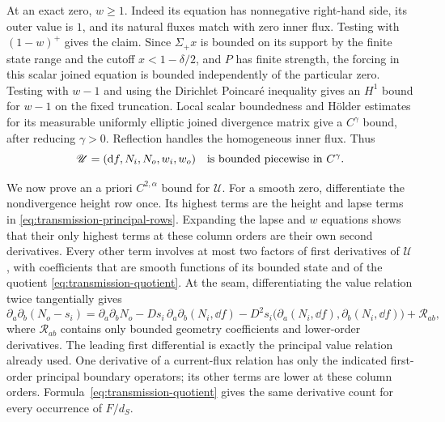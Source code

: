 At an exact zero, $w\geq1$.  Indeed its equation has nonnegative
right-hand side, its outer value is $1$, and its natural fluxes
match with zero inner flux.  Testing with $(1-w)^+$ gives the claim.
Since $\Sigma_+x$ is bounded on its support by the finite state
range and the cutoff $x<1-\delta/2$, and $P$ has finite strength,
the forcing in this scalar joined equation is bounded independently
of the particular zero.  Testing with $w-1$ and using the
Dirichlet Poincar\'e inequality gives an $H^1$ bound for $w-1$ on
the fixed truncation.  Local scalar boundedness and H\"older estimates
for its measurable uniformly elliptic joined divergence matrix give
a $C^\gamma$ bound, after reducing $\gamma>0$.  Reflection handles
the homogeneous inner flux.  Thus
\begin{equation}
 \mathscr U=(\mathop{}\!\mathrm d f,N_i,N_o,w_i,w_o)
 \quad\hbox{is bounded piecewise in }C^\gamma.
 \label{eq:transmission-state-holder-all}
\end{equation}

We now prove an a priori $C^{2,\alpha}$ bound for $\mathscr U$.
For a smooth zero, differentiate the nondivergence height row once.
Its highest terms are the height and lapse terms in
\eqref{eq:transmission-principal-rows}.  Expanding the lapse and
$w$ equations shows that their only highest terms at these column
orders are their own second derivatives.  Every other term involves
at most two factors of first derivatives of $\mathscr U$, with
coefficients that are smooth functions of its bounded state and of
the quotient \eqref{eq:transmission-quotient}.  At the seam,
differentiating the value relation twice tangentially gives
\begin{equation}
 \partial_a\partial_b(N_o-s_i)
  =\partial_a\partial_b N_o
    -D s_i\,\partial_a\partial_b(N_i,\dd f)
    -D^2s_i\bigl(\partial_a(N_i,\dd f),
                 \partial_b(N_i,\dd f)\bigr)
    +\mathcal R_{ab},
 \label{eq:transmission-value-differentiation}
\end{equation}
where $\mathcal R_{ab}$ contains only bounded geometry coefficients
and lower-order derivatives.  The leading first differential is
exactly the principal value relation already used.  One derivative
of a current-flux relation has only the indicated first-order
principal boundary operators; its other terms are lower at these
column orders.  Formula~\eqref{eq:transmission-quotient} gives the
same derivative count for every occurrence of $F/d_S$.

